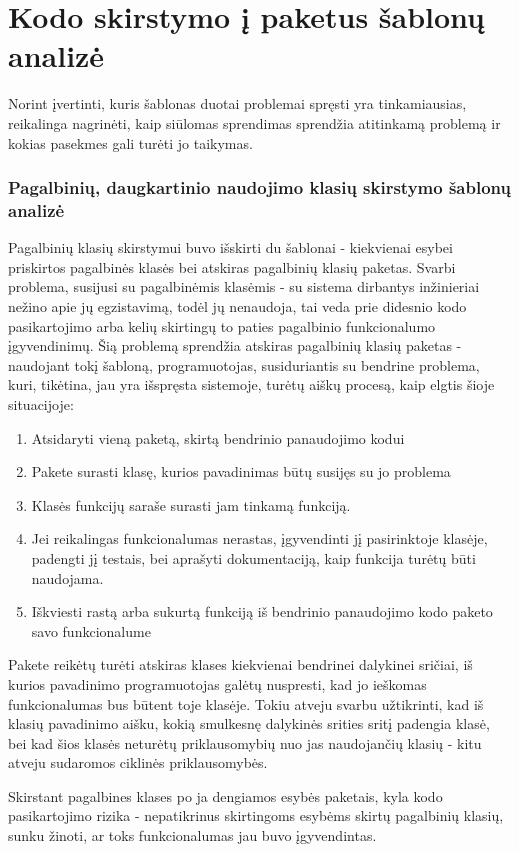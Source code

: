 \section{Kodo skirstymo į paketus šablonų analizė}
Norint įvertinti, kuris šablonas duotai problemai spręsti yra tinkamiausias, reikalinga nagrinėti, kaip siūlomas sprendimas
sprendžia atitinkamą problemą ir kokias pasekmes gali turėti jo taikymas.

\subsubsection{Pagalbinių, daugkartinio naudojimo klasių skirstymo šablonų analizė}
Pagalbinių klasių skirstymui buvo išskirti du šablonai - kiekvienai esybei priskirtos pagalbinės klasės bei atskiras pagalbinių klasių paketas.
Svarbi problema, susijusi su pagalbinėmis klasėmis - su sistema dirbantys inžinieriai nežino apie jų egzistavimą, todėl jų nenaudoja,
tai veda prie didesnio kodo pasikartojimo arba kelių skirtingų to paties pagalbinio funkcionalumo įgyvendinimų.
Šią problemą sprendžia atskiras pagalbinių klasių paketas - naudojant tokį šabloną, programuotojas, susiduriantis su bendrine problema, kuri, tikėtina, jau yra išspręsta sistemoje, turėtų
aiškų procesą, kaip elgtis šioje situacijoje:
\begin{enumerate}
    \item Atsidaryti vieną paketą, skirtą bendrinio panaudojimo kodui
    \item Pakete surasti klasę, kurios pavadinimas būtų susijęs su jo problema
    \item Klasės funkcijų saraše surasti jam tinkamą funkciją.
    \item Jei reikalingas funkcionalumas nerastas, įgyvendinti jį pasirinktoje klasėje, padengti jį testais,
    bei aprašyti dokumentaciją, kaip funkcija turėtų būti naudojama.
    \item Iškviesti rastą arba sukurtą funkciją iš bendrinio panaudojimo kodo paketo savo funkcionalume
\end{enumerate}
Pakete reikėtų turėti atskiras klases kiekvienai bendrinei dalykinei sričiai, iš kurios pavadinimo programuotojas galėtų nuspresti,
kad jo ieškomas funkcionalumas bus būtent toje klasėje.
Tokiu atveju svarbu užtikrinti, kad iš klasių pavadinimo aišku, kokią smulkesnę dalykinės srities sritį padengia klasė, bei kad šios klasės
neturėtų priklausomybių nuo jas naudojančių klasių - kitu atveju sudaromos ciklinės priklausomybės.

Skirstant pagalbines klases po ja dengiamos esybės paketais, kyla kodo pasikartojimo rizika - nepatikrinus skirtingoms esybėms skirtų pagalbinių
klasių, sunku žinoti, ar toks funkcionalumas jau buvo įgyvendintas.

